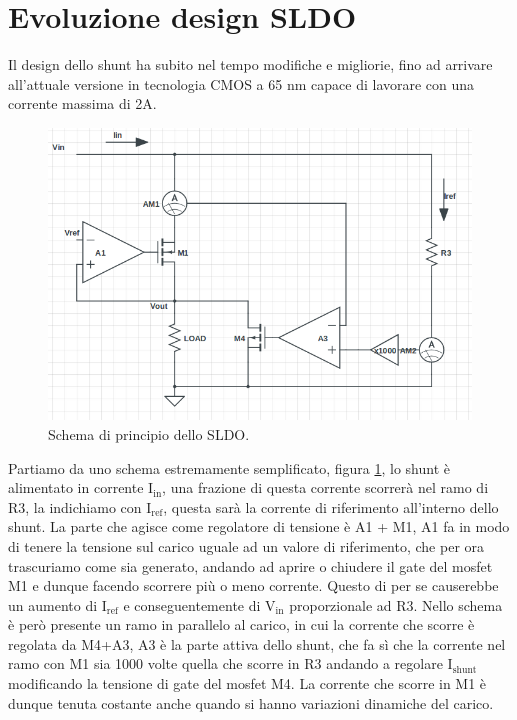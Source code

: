 \section{Evoluzione design SLDO}
Il design dello shunt ha subito nel tempo modifiche e migliorie, fino ad arrivare all'attuale versione in tecnologia CMOS a 65 nm capace di lavorare con una corrente massima di 2A.

\begin{figure}
\centering
\includegraphics[scale=.4]{Immagini/SLDOprova}
\caption{Schema di principio dello SLDO.}
\label{SLDOprova}
\end{figure}

Partiamo da uno schema estremamente semplificato, figura \ref{SLDOprova}, lo shunt è alimentato in corrente $\mathrm{I_{in}}$, una frazione di questa corrente scorrerà nel ramo di R3, la indichiamo con $\mathrm{I_{ref}}$, questa sarà la corrente di riferimento all'interno dello shunt. 
La parte che agisce come regolatore di tensione è A1 + M1, A1 fa in modo di tenere la tensione sul carico uguale ad un valore di riferimento, che per ora trascuriamo come sia generato, andando ad aprire o chiudere il gate del mosfet M1 e dunque facendo scorrere più o meno corrente. 
Questo di per se causerebbe un aumento di $\mathrm{I_{ref}}$ e conseguentemente di $\mathrm{V_{in}}$ proporzionale ad R3. Nello schema è però presente un ramo in parallelo al carico, in cui la corrente che scorre è regolata da M4+A3, A3 è la parte attiva dello shunt, che fa sì che la corrente nel ramo con M1 sia 1000 volte quella che scorre in R3 andando a regolare $\mathrm{I_{shunt}}$ modificando la tensione di gate del mosfet M4. 
La corrente che scorre in M1 è dunque tenuta costante anche quando si hanno variazioni dinamiche del carico.

